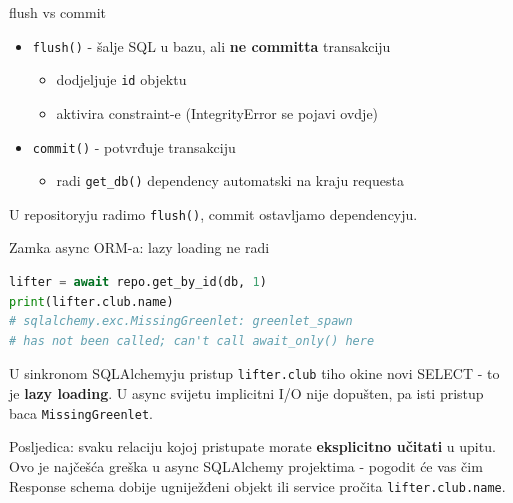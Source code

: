 \begin{frame}{flush vs commit}
\begin{itemize}
  \item \texttt{flush()} - šalje SQL u bazu, ali \textbf{ne committa} transakciju
  \begin{itemize}
    \item dodjeljuje \texttt{id} objektu
    \item aktivira constraint-e (IntegrityError se pojavi ovdje)
  \end{itemize}
  \item \texttt{commit()} - potvrđuje transakciju
  \begin{itemize}
    \item radi \texttt{get\_db()} dependency automatski na kraju requesta
  \end{itemize}
\end{itemize}

\vspace{0.6em}
U repositoryju radimo \texttt{flush()}, commit ostavljamo dependencyju.
\end{frame}

\begin{frame}[fragile,shrink=5]{Zamka async ORM-a: lazy loading ne radi}
\begin{lstlisting}[language=python]
lifter = await repo.get_by_id(db, 1)
print(lifter.club.name)
# sqlalchemy.exc.MissingGreenlet: greenlet_spawn
# has not been called; can't call await_only() here
\end{lstlisting}

\vspace{0.4em}
U sinkronom SQLAlchemyju pristup \texttt{lifter.club} tiho okine novi SELECT - to je \textbf{lazy loading}. U async svijetu implicitni I/O nije dopušten, pa isti pristup baca \texttt{MissingGreenlet}.

\vspace{0.4em}
Posljedica: svaku relaciju kojoj pristupate morate \textbf{eksplicitno učitati} u upitu. Ovo je najčešća greška u async SQLAlchemy projektima - pogodit će vas čim Response schema dobije ugniježđeni objekt ili service pročita \texttt{lifter.club.name}.
\end{frame}

